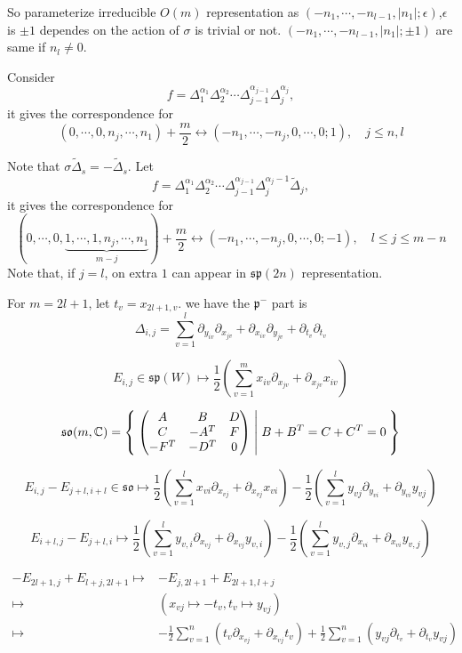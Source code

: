\documentclass[12pt]{article}
\def\bC{{\mathbb{C}}}
\def\sp{{\mathfrak{sp}}}
\def\tDelta{\widetilde{\Delta}}
\def\aso{\mathfrak{so}}
\def\asp{\mathfrak{sp}}
\def\fpp{\mathfrak{p}}
\newcounter{ssection}
\renewcommand{\subsection}{
  \addtocounter{ssection}{1}{\bf  \arabic{ssection}.\  }}
\begin{document}
So parameterize irreducible $O(m)$ representation as 
$(-n_1, \cdots, -n_{l-1},|n_1|;\epsilon)$,$\epsilon$ is $\pm 1$ dependes on the action 
of $\sigma$ is trivial or not.
$(-n_1,\cdots, -n_{l-1},|n_1|;\pm 1)$ are same if $n_l\neq 0$.   


Consider 
\[
f = \Delta_1^{\alpha_1}\Delta_2^{\alpha_2} \cdots \Delta_{j-1}^{\alpha_{j-1}}
\Delta_j^{\alpha_j},
\]
it gives the correspondence for 
\[
(0,\cdots, 0, n_j, \cdots, n_1) + \frac{m}{2}
\leftrightarrow 
(-n_1, \cdots, -n_j, 0, \cdots, 0;1), \quad j\leq n, l
\]

Note that $\sigma \tDelta_s = -\tDelta_s$. Let
\[
f=\Delta_1^{\alpha_1}\Delta_2^{\alpha_2} \cdots \Delta_{j-1}^{\alpha_{j-1}}
\Delta_j^{\alpha_j-1}\tDelta_j,
\]
it gives the correspondence for 
\[
(0,\cdots, 0,\underbrace{1,\cdots, 1, n_j, \cdots, n_1}_{m-j}) + \frac{m}{2}
\leftrightarrow 
(-n_1, \cdots, -n_j, 0, \cdots, 0;-1), \quad l\leq j \leq m-n
\]
Note that, if $j=l$, on extra $1$ can appear in $\sp(2n)$ representation.

\subsection{m=2l+1}

For $m=2l+1$, let $t_v = x_{2l+1,v}$.  
we have 
the $\fpp^-$ part is 
\[
\Delta_{i,j} = 
\sum_{v=1}^l \partial_{y_{iv}}\partial_{x_{jv}}
+ \partial_{x_{iv}}\partial_{y_{jv}} + \partial_{t_v}\partial_{t_v}
\]


\[
E_{i,j} \in \asp(W)  
 \mapsto \frac{1}{2}(\sum_{v=1}^m x_{iv}\partial_{x_{jv}}+ \partial_{x_{jv}}x_{iv}) 
\]

\[
\aso(m,\bC) = \Set{
\begin{pmatrix} 
A & B & D\\
C & -A^T &F \\
-F^T& -D^T& 0
\end{pmatrix} |
B+B^T=C+C^T=0}
\]

\[
E_{i,j}-E_{j+l,i+l} \in \aso \mapsto 
 \frac{1}{2}(\sum_{v=1}^l x_{vi}\partial_{x_{vj}}+ \partial_{x_{vj}}x_{vi})
-\frac{1}{2}(\sum_{v=1}^l y_{vj}\partial_{y_{vi}}+ \partial_{y_{vi}}y_{vj})
\]

\[
E_{i+l,j}-E_{j+l,i}\mapsto 
 \frac{1}{2}(\sum_{v=1}^l y_{v,i}\partial_{x_{vj}}+\partial_{x_{vj}}y_{v,i})
-\frac{1}{2}(\sum_{v=1}^l y_{v,j}\partial_{x_{vi}}+\partial_{x_{vi}}y_{v,j})
\]

\[
\begin{split}
-E_{2l+1,j}+ E_{l+j,2l+1} \mapsto&
-E_{j,2l+1}+E_{2l+1,l+j} \\
\mapsto&
(x_{vj}\mapsto -t_v, t_v\mapsto y_{vj})\\
\mapsto&
-\frac{1}{2}\sum_{v=1}^n (t_v\partial_{x_{vj}}+\partial_{x_{vj}}t_v)
+\frac{1}{2}\sum_{v=1}^n (y_{vj}\partial_{t_v}+\partial_{t_v}y_{vj})
\end{split}
\]
\end{document}
